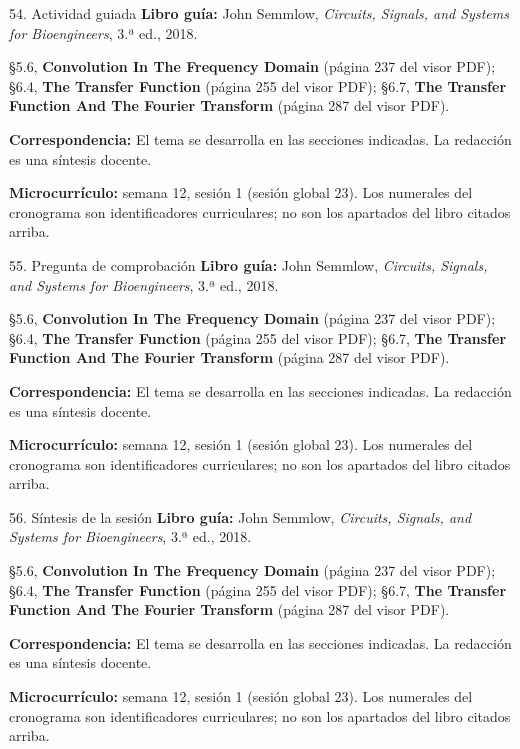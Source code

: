 \documentclass[
  10pt,
  ignorenonframetext,
  aspectratio=169,
  spanish,
]{beamer}
\begin{document}
\begin{frame}{54. Actividad guiada}
\label{actividad-guiada-2}
\textbf{Libro guía:} John Semmlow, \emph{Circuits, Signals, and Systems
for Bioengineers}, 3.ª ed., 2018.

§5.6, \textbf{Convolution In The Frequency Domain} (página 237 del visor
PDF); §6.4, \textbf{The Transfer Function} (página 255 del visor PDF);
§6.7, \textbf{The Transfer Function And The Fourier Transform} (página
287 del visor PDF).

\textbf{Correspondencia:} El tema se desarrolla en las secciones
indicadas. La redacción es una síntesis docente.

\textbf{Microcurrículo:} semana 12, sesión 1 (sesión global 23). Los
numerales del cronograma son identificadores curriculares; no son los
apartados del libro citados arriba.
\end{frame}

\begin{frame}{55. Pregunta de comprobación}
\label{pregunta-de-comprobaciuxf3n-2}
\textbf{Libro guía:} John Semmlow, \emph{Circuits, Signals, and Systems
for Bioengineers}, 3.ª ed., 2018.

§5.6, \textbf{Convolution In The Frequency Domain} (página 237 del visor
PDF); §6.4, \textbf{The Transfer Function} (página 255 del visor PDF);
§6.7, \textbf{The Transfer Function And The Fourier Transform} (página
287 del visor PDF).

\textbf{Correspondencia:} El tema se desarrolla en las secciones
indicadas. La redacción es una síntesis docente.

\textbf{Microcurrículo:} semana 12, sesión 1 (sesión global 23). Los
numerales del cronograma son identificadores curriculares; no son los
apartados del libro citados arriba.
\end{frame}

\begin{frame}{56. Síntesis de la sesión}
\label{suxedntesis-de-la-sesiuxf3n-2}
\textbf{Libro guía:} John Semmlow, \emph{Circuits, Signals, and Systems
for Bioengineers}, 3.ª ed., 2018.

§5.6, \textbf{Convolution In The Frequency Domain} (página 237 del visor
PDF); §6.4, \textbf{The Transfer Function} (página 255 del visor PDF);
§6.7, \textbf{The Transfer Function And The Fourier Transform} (página
287 del visor PDF).

\textbf{Correspondencia:} El tema se desarrolla en las secciones
indicadas. La redacción es una síntesis docente.

\textbf{Microcurrículo:} semana 12, sesión 1 (sesión global 23). Los
numerales del cronograma son identificadores curriculares; no son los
apartados del libro citados arriba.
\end{frame}
\end{document}
